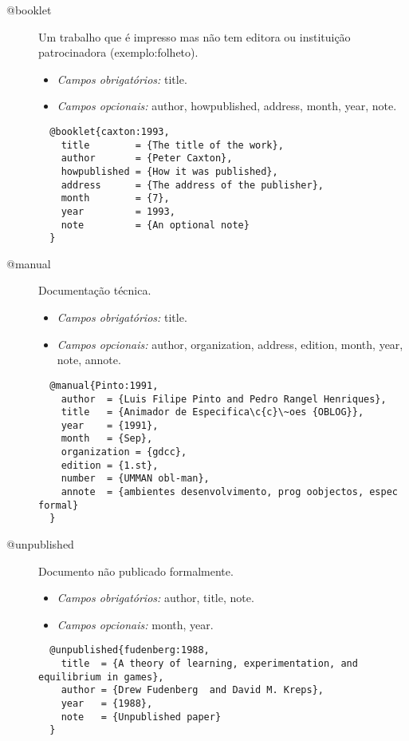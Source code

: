 \documentclass{article}%
\begin{document}
\begin{description}
  \item[@booklet] Um trabalho que é impresso mas não tem editora ou instituição patrocinadora (exemplo:folheto).
  \begin{itemize}
    \item \emph{Campos obrigatórios:} title.
    \item \emph{Campos opcionais:} author, howpublished, address, month, year, note.
  \end{itemize}

  \begin{lstlisting}
  @booklet{caxton:1993,
    title        = {The title of the work},
    author       = {Peter Caxton},
    howpublished = {How it was published},
    address      = {The address of the publisher},
    month        = {7},
    year         = 1993,
    note         = {An optional note}
  }
  \end{lstlisting}


  \item[@manual] Documentação técnica.
  \begin{itemize}
    \item \emph{Campos obrigatórios:} title.
    \item \emph{Campos opcionais:} author, organization, address, edition, month, year, note, annote.
  \end{itemize}

  \begin{lstlisting}
  @manual{Pinto:1991,
    author  = {Luis Filipe Pinto and Pedro Rangel Henriques},
    title   = {Animador de Especifica\c{c}\~oes {OBLOG}},
    year    = {1991},
    month   = {Sep},
    organization = {gdcc},
    edition = {1.st},
    number  = {UMMAN obl-man},
    annote  = {ambientes desenvolvimento, prog oobjectos, espec formal}
  }
  \end{lstlisting}


  \item[@unpublished] Documento não publicado formalmente.
  \begin{itemize}
    \item \emph{Campos obrigatórios:} author, title, note.
    \item \emph{Campos opcionais:} month, year.
  \end{itemize}

  \begin{lstlisting}
  @unpublished{fudenberg:1988,
    title  = {A theory of learning, experimentation, and equilibrium in games},
    author = {Drew Fudenberg  and David M. Kreps},
    year   = {1988},
    note   = {Unpublished paper}
  }
  \end{lstlisting}
\end{description}
\end{document}
